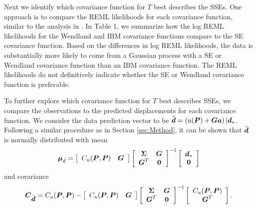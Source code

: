 \documentclass[extra,mreferee]{gji}
\begin{document}
Next we identify which covariance function for $T$ best describes the
SSEs. One approach is to compare the REML likelihoods for each
covariance function, similar to the analysis in \citet{Langbein2004}.
In Table 1, we summarize how the log REML likelihoods for the Wendland
and IBM covariance functions compare to the SE covariance function.
Based on the differences in log REML likelihoods, the data is
substantially more likely to come from a Gaussian process with a SE or
Wendland covariance function than an IBM covariance function. The REML
likelihoods do not definitively indicate whether the SE or Wendland
covariance function is preferable.

To further explore which covariance function for $T$ best describes
SSEs, we compare the observations to the predicted displacements for
each covariance function. We consider the data prediction vector to be
$\hat{\data} = \left(u(\points) + \G\mitbf{a}\right)|\data_*$.
Following a similar procedure as in Section \ref{sec:Method}, it can
be shown that $\hat{\data}$ is normally distributed with mean
\begin{equation}\label{eq:DataPredMean}
\mitbf{\mu}_{\hat{d}} = \left[\begin{array}{cc}
                           C_u(\points,\points) & \G \\
                           \end{array}\right]
                     \left[\begin{array}{cc}
                           \mitbf{\Sigma} & \G \\
                           \G^T  & \zeros \\
                           \end{array}\right]^{-1}
                     \left[\begin{array}{c}
                           \data_* \\
                           \zeros \\
                           \end{array}\right]
\end{equation}  
and covariance
\begin{equation}\label{eq:DataPredCov}
\mitbf{C}_{\hat{\data}} = C_u(\points,\points) - 
                        \left[\begin{array}{cc}
                              C_u(\points,\points) & \G \\
                              \end{array}\right]
                        \left[\begin{array}{cc}
                              \mitbf{\Sigma} & \G \\
                              \G^T  & \zeros \\
                              \end{array}\right]^{-1}
                        \left[\begin{array}{c}
                              C_u(\points,\points) \\
                              \G^T \\
                              \end{array}\right].
\end{equation}
\end{document}
